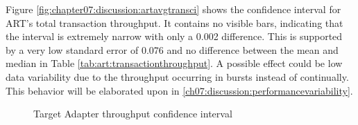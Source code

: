 Figure \ref{fig:chapter07:discussion:artavgtransci} shows the confidence interval for \ac{ART}'s total transaction throughput. It contains no visible bars, indicating that the interval is extremely narrow with only a 0.002 difference. This is supported by a very low standard error of 0.076 and no difference between the mean and median in Table \ref{tab:art:transactionthroughput}. A possible effect could be low data variability due to the throughput occurring in bursts instead of continually. This behavior will be elaborated upon in \ref{ch07:discussion:performancevariability}.

\begin{figure}[htbp]
    \centering
    \hfill
    \hfill
    \caption{Target Adapter throughput confidence interval}
    \label{fig:chapter07:discussion:artci}
\end{figure}

